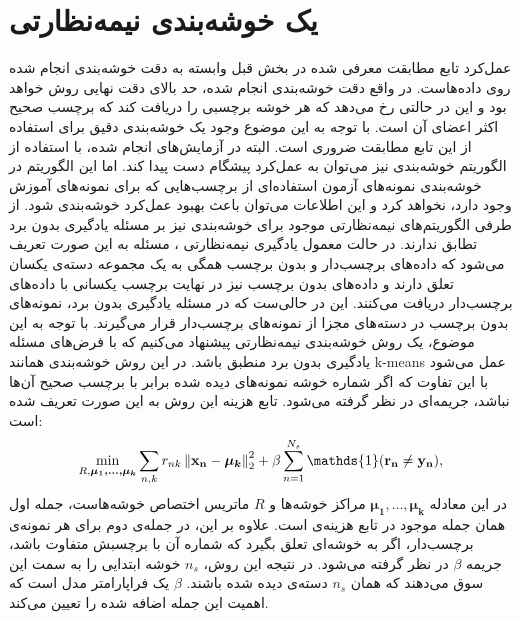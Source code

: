 \section{یک خوشه‌بندی نیمه‌نظارتی}\label{clustering_method}
عمل‌کرد تابع مطابقت معرفی شده در بخش قبل وابسته به دقت خوشه‌بندی انجام شده روی داده‌هاست. در واقع دقت خوشه‌بندی انجام شده، حد بالای دقت نهایی روش خواهد بود و این در حالتی رخ می‌دهد که هر خوشه برچسبی را دریافت کند که برچسب صحیح  اکثر اعضای آن است. با توجه به این موضوع وجود یک خوشه‌بندی دقیق برای استفاده از این تابع مطابقت ضروری است. البته در آزمایش‌های انجام شده، با استفاده از  الگوریتم خوشه‌بندی
 \cite{kmeans}
نیز می‌توان به عمل‌کرد پیشگام دست پیدا کند. اما این الگوریتم در خوشه‌بندی نمونه‌های آزمون استفاده‌ای از برچسب‌هایی که برای نمونه‌های آموزش وجود دارد، نخواهد کرد و این اطلاعات می‌توان باعث بهبود عمل‌کرد خوشه‌بندی شود. از طرفی الگوریتم‌های نیمه‌نظارتی موجود برای خوشه‌بندی نیز بر مسئله یادگیری بدون برد تطابق ندارند. در حالت معمول یادگیری نیمه‌نظارتی \cite{chapel06}، مسئله به این صورت تعریف می‌شود که داده‌های برچسب‌دار و بدون برچسب همگی به یک مجموعه دسته‌ی یکسان تعلق دارند و داده‌های بدون برچسب نیز در نهایت برچسب یکسانی با داده‌های برچسب‌دار دریافت می‌کنند. این در حالی‌ست که در مسئله یادگیری بدون برد، نمونه‌های بدون برچسب در دسته‌های مجزا از نمونه‌های برچسب‌دار قرار می‌گیرند. با توجه به این موضوع، یک روش خوشه‌بندی نیمه‌نظارتی پیشنهاد می‌کنیم که با فرض‌های مسئله یادگیری بدون برد منطبق باشد. در این روش خوشه‌بندی همانند k-means عمل می‌شود با این تفاوت که اگر شماره خوشه نمونه‌های دیده شده  برابر با برچسب صحیح آن‌ها نباشد، جریمه‌ای در نظر گرفته می‌شود. تابع هزینه این روش به این صورت تعریف شده است:
\begin{equation} \label{eq:my_clustering}
\min_{R, \boldsymbol{\mu_1, \ldots, \mu_k }}  \sum_{n,k} r_{nk} \normtwo{\mathbf{x_n} - \boldsymbol{\mu_k}} +
 \beta \sum_{n=1}^{N_s} \mathds{1}(\mathbf{r_n} \neq \mathbf{y_n}),
\end{equation}
در این معادله $ \boldsymbol{\mu_1, \ldots, \mu_k }$ مراکز خوشه‌ها و $R$ ماتریس اختصاص خوشه‌هاست، جمله اول همان جمله موجود در تابع هزینه‌ی
است. علاوه بر این، در جمله‌ی دوم برای هر نمونه‌ی برچسب‌دار، اگر به خوشه‌ای تعلق بگیرد که شماره آن با برچسبش متفاوت باشد، جریمه $\beta$ در نظر گرفته می‌شود. در نتیجه این روش، $n_s$ خوشه ابتدایی را به سمت این سوق می‌دهند که همان $n_s$ دسته‌ی دیده شده باشند.  $\beta$ یک فراپارامتر مدل است که اهمیت این جمله اضافه شده را تعیین می‌کند.


